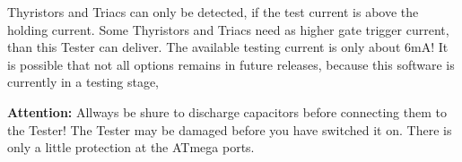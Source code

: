 Thyristors and Triacs can only be detected, if the test current is above the holding current.
Some Thyristors and Triacs need as higher gate trigger current, than this Tester can deliver.
The available testing current is only about 6mA!
It is possible that not all options remains in future releases, because this software is currently in a testing stage,

\vspace{1cm}
\textbf{{\Large Attention:}} Allways be shure to discharge capacitors before connecting them to the Tester!
The Tester may be damaged before you have switched it on. There is only a little protection at the ATmega ports.


